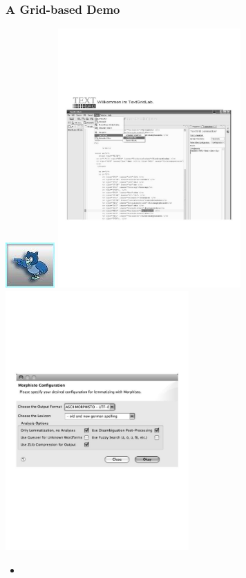 \documentclass {beamer}
\begin{document}
\frame
{  \frametitle{A Grid-based Demo}
\includegraphics[scale=0.5] {TextGrid.jpg}
\includegraphics[width=7cm] {morpholymp1.jpg}
\includegraphics[width=7cm] {configuration3.jpg}

 \begin{itemize}
\item  {}
\end{itemize}
}
\end{document}

